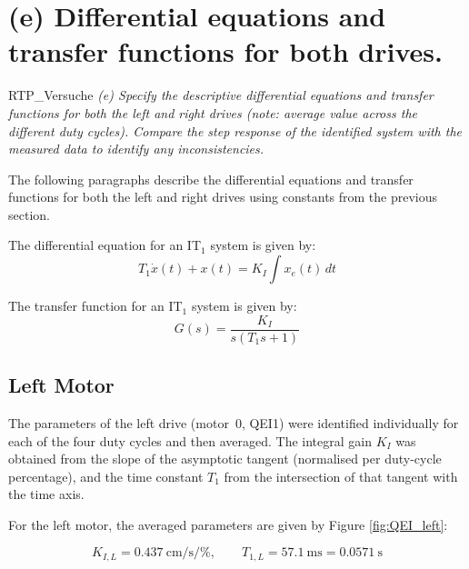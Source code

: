 \documentclass[12pt, oneside, a4paper]{scrreprt}
\begin{document}
            \cleardoubleemptypage

        \section{(e) Differential equations and transfer functions for both drives.}\label{sec:e-differential-equations}

            \begin{displaycquote}{RTP_Versuche}
                \footnotesize{\textit{(e) Specify the descriptive differential equations and transfer functions for both the left and right drives (note: average value across the different duty cycles). Compare the step response of the identified system with the measured data to identify any inconsistencies.}}
            \end{displaycquote}\label{task(e)}

            The following paragraphs describe the differential equations and transfer functions for both the left and right drives using constants from the previous section.

            The differential equation for an IT$_1$ system is given by:
            \begin{equation}
                T_1 \dot{x}(t) + x(t) = K_I \int x_e(t) \, dt
            \end{equation}

            The transfer function for an IT$_1$ system is given by:
            \begin{equation}
                G(s) = \frac{K_I}{s(T_1 s + 1)} 
            \end{equation}


            \subsection{Left Motor}\label{subsec:left-motor}

            The parameters of the left drive (motor~0, QEI1) were identified individually for each of the four duty cycles and then averaged. The integral gain $K_I$ was obtained from the slope of the asymptotic tangent (normalised per duty-cycle percentage), and the time constant $T_1$ from the intersection of that tangent with the time axis.

            For the left motor, the averaged parameters are given by Figure \ref{fig:QEI_left}:

            \begin{equation}
                K_{I,L} = \qty{0.437}{\centi\metre\per\second\per\percent}, \qquad
                T_{1,L} = \qty{57.1}{\milli\second} = \qty{0.0571}{\second}
            \end{equation}
\end{document}
